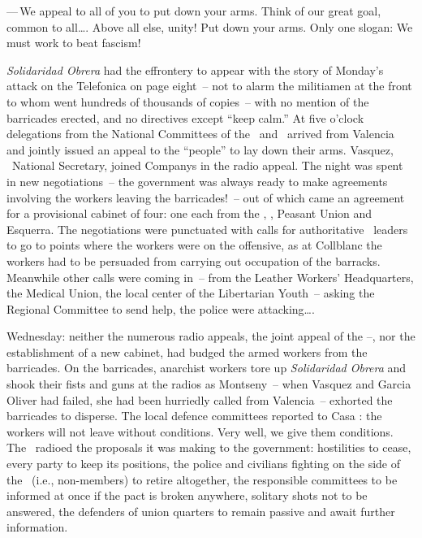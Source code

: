 \medskip

—\,We appeal to all of you to put down your arms. Think of our great goal, common to all\dots. Above all else, unity! Put down your arms. Only one slogan: We must work to beat fascism!

\medskip

\emph{Solidaridad Obrera} had the effrontery to appear with the story of Monday’s attack on the Telefonica on page eight~-- not to alarm the militiamen at the front to whom went hundreds of thousands of copies~-- with no mention of the barricades erected, and no directives except ``keep calm.'' At five o’clock delegations from the National Committees of the \UGT\ and \CNT\ arrived from Valencia and jointly issued an appeal to the ``people'' to lay down their arms. Vasquez, \CNT\ National Secretary, joined Companys in the radio appeal. The night was spent in new negotiations~-- the government was always ready to make agreements involving the workers leaving the barricades!~-- out of which came an agreement for a provisional cabinet of four: one each from the \CNT\kn, \PSUC\kn, Peasant Union and Esquerra. The negotiations were punctuated with calls for authoritative \CNT\ leaders to go to points where the workers were on the offensive, as at Collblanc the workers had to be persuaded from carrying out occupation of the barracks. Meanwhile other calls were coming in~-- from the Leather Workers’ Headquarters, the Medical Union, the local center of the Libertarian Youth~-- asking the Regional Committee to send help, the police were attacking\dots.

Wednesday: neither the numerous radio appeals, the joint appeal of the \UGT--\CNT\kn, nor the establishment of a new cabinet, had budged the armed workers from the barricades. On the barricades, anarchist workers tore up \emph{Solidaridad Obrera} and shook their fists and guns at the radios as Montseny~-- when Vasquez and Garcia Oliver had failed, she had been hurriedly called from Valencia~-- exhorted the barricades to disperse. The local defence committees reported to Casa \CNT: the workers will not leave without conditions. Very well, we give them conditions. The \CNT\ radioed the proposals it was making to the government: hostilities to cease, every party to keep its positions, the police and civilians fighting on the side of the \CNT\ (i.e., non-members) to retire altogether, the responsible committees to be informed at once if the pact is broken anywhere, solitary shots not to be answered, the defenders of union quarters to remain passive and await further information.

